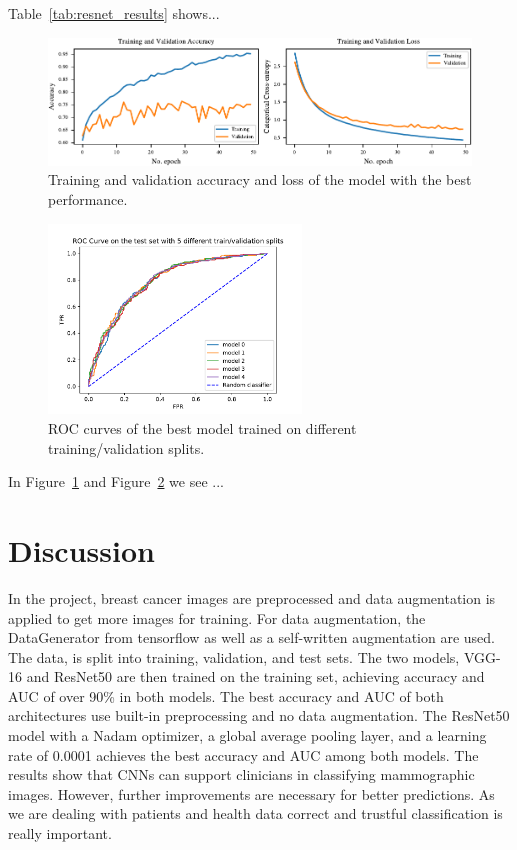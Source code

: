 \documentclass[sn-mathphys,Numbered]{sn-jnl}%
\theoremstyle{thmstyleone}%
\theoremstyle{thmstyletwo}%
\theoremstyle{thmstylethree}%
\begin{document}
Table~\ref{tab:resnet_results} shows...
\begin{figure}[ht]%
\centering
\includegraphics[width=1.0\textwidth]{ResNet50_GlobalAvg_results.pdf}
\caption{Training and validation accuracy and loss of the model with the best performance.}
\label{fig:train_val_performance_resnet}
\end{figure}
\begin{figure}[ht]%
\centering
\includegraphics[width=0.6\textwidth]{final_ROC_ResNet50.pdf}
\caption{ROC curves of the best model trained on different training/validation splits.}
\label{fig:ROC_resnet}
\end{figure}
In Figure~\ref{fig:train_val_performance_resnet} and Figure~\ref{fig:ROC_resnet} we see ...
\section{Discussion}
\label{Discussion}
In the project, breast cancer images are preprocessed and data augmentation is applied to get more images for training. For data augmentation, the DataGenerator from tensorflow as well as a self-written augmentation are used.\\
The data, is split into training, validation, and test sets. The two models, VGG-16 and ResNet50 are then trained on the training set, achieving accuracy and AUC of over 90\% in both models. The best accuracy and AUC of both architectures use built-in preprocessing  and no data augmentation. The ResNet50 model with a Nadam optimizer, a global average pooling layer, and a learning rate of 0.0001 achieves the best accuracy and AUC among both models.
The results show that CNNs can support clinicians in classifying mammographic images. However, further improvements are necessary for better predictions. As we are dealing with patients and health data correct and trustful classification is really important.
\end{document}
